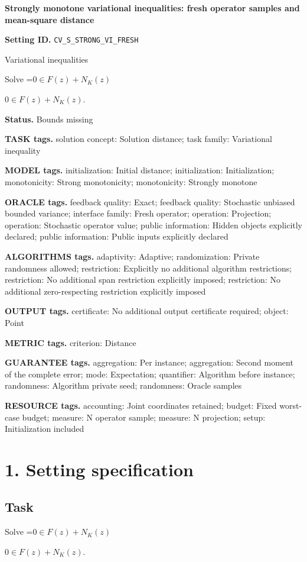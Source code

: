 \documentclass[10pt,a4paper]{article}
\newcommand{\AtlasMath}[1]{\par\begingroup\centering\setbox0=\hbox{$\displaystyle #1$}\ifdim\wd0>1.4\linewidth\typeout{ATLAS WIDE FORMULA: \the\wd0}\fi\ifdim\wd0>\linewidth\resizebox{\linewidth}{!}{\box0}\else\box0\fi\par\endgroup}
\newcommand{\AtlasInlineMath}[1]{\begingroup\setbox0=\hbox{$#1$}\ifdim\wd0>.4\linewidth\endgroup\AtlasMath{#1}\else\endgroup$#1$\fi}
\begin{document}
\raggedright

{\LARGE\bfseries\sffamily\color{AtlasNavy} Strongly monotone variational inequalities: fresh operator samples and mean-square distance\par}\vspace{5pt}
\textbf{Setting ID.} \texttt{CV\_\allowbreak{}S\_\allowbreak{}STRONG\_\allowbreak{}VI\_\allowbreak{}FRESH}

Variational inequalities

Solve \AtlasInlineMath{0\in F(z)+N_K(z)}.

\textbf{Status.} Bounds missing

\textbf{TASK tags.} solution concept: Solution distance; task family: Variational inequality

\textbf{MODEL tags.} initialization: Initial distance; initialization: Initialization; monotonicity: Strong monotonicity; monotonicity: Strongly monotone

\textbf{ORACLE tags.} feedback quality: Exact; feedback quality: Stochastic unbiased bounded variance; interface family: Fresh operator; operation: Projection; operation: Stochastic operator value; public information: Hidden objects explicitly declared; public information: Public inputs explicitly declared

\textbf{ALGORITHMS tags.} adaptivity: Adaptive; randomization: Private randomness allowed; restriction: Explicitly no additional algorithm restrictions; restriction: No additional span restriction explicitly imposed; restriction: No additional zero-respecting restriction explicitly imposed

\textbf{OUTPUT tags.} certificate: No additional output certificate required; object: Point

\textbf{METRIC tags.} criterion: Distance

\textbf{GUARANTEE tags.} aggregation: Per instance; aggregation: Second moment of the complete error; mode: Expectation; quantifier: Algorithm before instance; randomness: Algorithm private seed; randomness: Oracle samples

\textbf{RESOURCE tags.} accounting: Joint coordinates retained; budget: Fixed worst-case budget; measure: N operator sample; measure: N projection; setup: Initialization included

\section{1. Setting specification}
\subsection{Task}
Solve \AtlasInlineMath{0\in F(z)+N_K(z)}.
\end{document}

